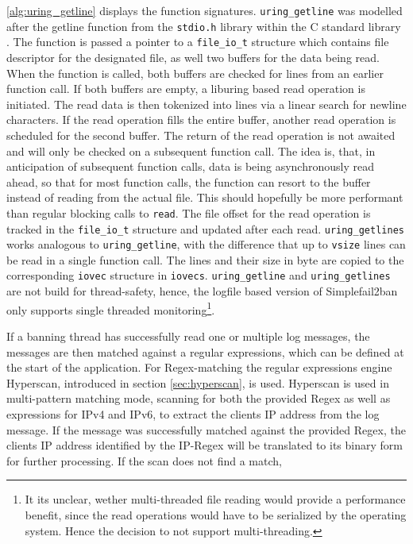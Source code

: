\ref{alg:uring_getline} displays the function signatures. \texttt{uring\_getline} was modelled after the getline function
from the \texttt{stdio.h} library within the C standard library \cite{getline}. The function is passed a pointer to a \texttt{file\_io\_t} structure   
which contains file descriptor for the designated file, as well two buffers for the data being read. When the function is called, both buffers are checked for lines from an earlier function call.
If both buffers are empty, a liburing based read operation
is initiated. The read data is then tokenized into lines via a linear search for newline characters. If the read operation fills the entire buffer, another read
operation is scheduled for the second buffer. The return of the read operation is not awaited and will only be checked on a subsequent function call. The idea is,
that, in anticipation of subsequent function calls, data is being asynchronously read ahead, so that for most function calls, the function can resort to the buffer instead
of reading from the actual file. This should hopefully be more performant than regular blocking calls to \texttt{read}. The file offset for the read operation is tracked in
the \texttt{file\_io\_t} structure and updated after each read. \texttt{uring\_getlines} works analogous to \texttt{uring\_getline}, with the difference that up to \texttt{vsize}
lines can be read in a single function call. The lines and their size in byte are copied to the corresponding \texttt{iovec} structure in \texttt{iovecs}.
\texttt{uring\_getline} and \texttt{uring\_getlines} are not build for thread-safety, hence, the logfile based version of Simplefail2ban only supports single threaded monitoring\footnote{It its unclear, wether multi-threaded file reading would provide a performance benefit, since the read operations would have to be serialized by the operating system. Hence the decision to not support multi-threading.}.
\par
If a banning thread has successfully read one or multiple log messages, the messages are then matched against a regular expressions, which can be defined at the start of the application.
For \ac{Regex}-matching the regular expressions engine Hyperscan, introduced in section \ref{sec:hyperscan}, is used. Hyperscan is used in multi-pattern matching mode, scanning
for both the provided \ac{Regex} as well as expressions for \ac{IPv4} and \ac{IPv6}, to extract the clients \ac{IP} address from the log message. If the message was successfully matched against
the provided \ac{Regex}, the clients \ac{IP} address identified by the \ac{IP}-\ac{Regex} will be translated to its binary form for further processing. If the scan does not find a match, 
